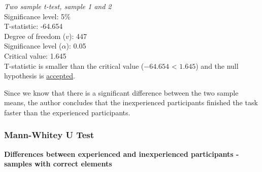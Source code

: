  \begin{center}
	\begin{tcolorbox}[box align=center,width=\textwidth-5cm]
		\centering
		\textit{Two sample t-test, sample 1 and 2}\\
		Significance level: 5\%  \\[0.5cm]
		
		T-statistic: -64.654 \\
		Degree of freedom ($v$): 447 \\ %
		Significance level ($\alpha$): 0.05 \\
		Critical value: 1.645\\[0.2cm]
		
		T-statistic is smaller than the critical value ($-64.654$ < $1.645$) and the null hypothesis is \underline{accepted}.\\[0.5cm]
		
	\end{tcolorbox} 
\end{center}

Since we know that there is a significant difference between the two sample means, the author concludes that the inexperienced participants finished the task faster than the experienced participants. \newline

\subsubsection{Mann-Whitey U Test}

\textbf{Differences between experienced and inexperienced participants - samples with correct elements}\newline








